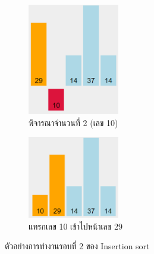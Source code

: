 \begin{figure}[h!]
	\centering
    \begin{subfigure}{.5\textwidth}
    	\centering
        \includegraphics[width=4cm]{images/insertion_sort_round-2-1}
        \caption{พิจารณาจำนวนที่ 2 (เลข 10)}
        \label{fig:insertion_sort_round-2-1}
    \end{subfigure}%
    \begin{subfigure}{.5\textwidth}
    	\centering
        \includegraphics[width=4cm]{images/insertion_sort_round-2-2}
        \caption{แทรกเลข 10 เข้าไปหน้าเลข 29}
        \label{fig:insertion_sort_round-2-2}
    \end{subfigure}
    \caption{ตัวอย่างการทำงานรอบที่ 2 ของ Insertion sort}
    \label{fig:insertion_sort_round-2}
\end{figure}

